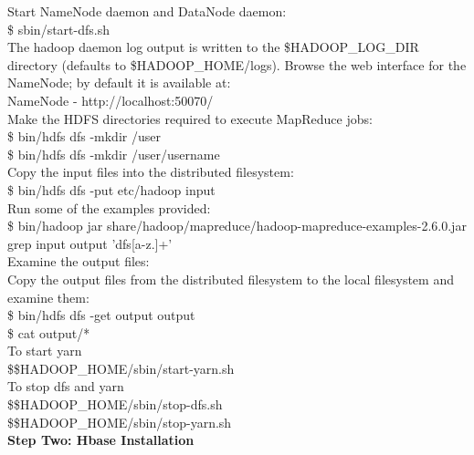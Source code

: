 \documentclass[oneside,a4paper,12pt]{report}
\begin{document}
{\begin{appendices}
\noindent Start NameNode daemon and DataNode daemon: \\

  \$ sbin/start-dfs.sh \\

\noindent The hadoop daemon log output is written to the \$HADOOP\_LOG\_DIR directory (defaults to \$HADOOP\_HOME/logs).
Browse the web interface for the NameNode; by default it is available at: \\

    NameNode - http://localhost:50070/ \\

\noindent Make the HDFS directories required to execute MapReduce jobs: \\

  \$ bin/hdfs dfs -mkdir /user \\
  \$ bin/hdfs dfs -mkdir /user/username \\

\noindent Copy the input files into the distributed filesystem: \\

  \$ bin/hdfs dfs -put etc/hadoop input \\

\noindent Run some of the examples provided: \\

  \$ bin/hadoop jar share/hadoop/mapreduce/hadoop-mapreduce-examples-2.6.0.jar grep input output 'dfs[a-z.]+' \\

\noindent Examine the output files: \\

\noindent Copy the output files from the distributed filesystem to the local filesystem and examine them: \\

  \$ bin/hdfs dfs -get output output \\
  \$ cat output/*  \\
  
\noindent To start yarn \\
  \$\$HADOOP\_HOME/sbin/start-yarn.sh \\
  
  
\noindent To stop dfs and yarn \\
  \$\$HADOOP\_HOME/sbin/stop-dfs.sh \\
\$\$HADOOP\_HOME/sbin/stop-yarn.sh \\


\noindent \textbf{Step Two: Hbase Installation} \\\\


\end{appendices}}
\end{document}
